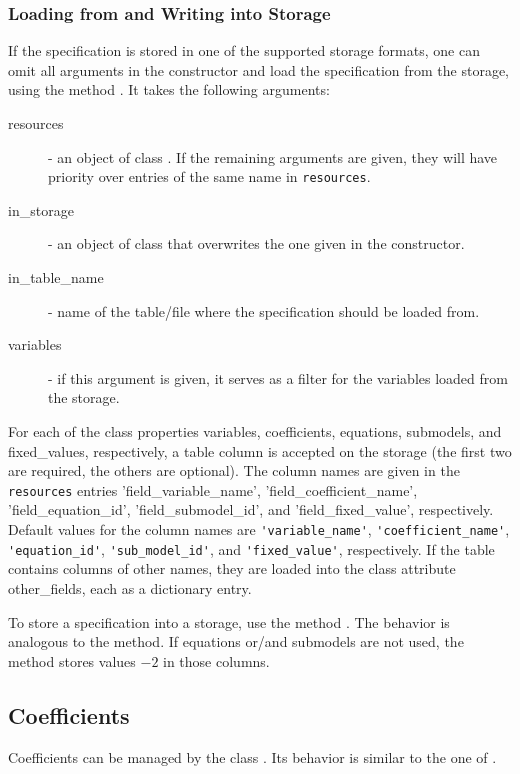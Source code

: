\subsubsection{Loading from and Writing into Storage}
%
If the specification is stored in one of the supported storage formats,
one can omit all arguments in the constructor and load the specification
from the storage, using the method . It takes the following
arguments:
\begin{description}
\item[resources] - an object of class . If the remaining
  arguments are given, they will have priority over entries of the same name
  in \verb|resources|.
\item[in_storage] -  an object of class  that overwrites the
  one given in the constructor.
\item[in_table_name] - name of the table/file where the specification should
  be loaded from.
\item[variables] - if this argument is given, it serves as a filter for the
  variables loaded from the storage.
\end{description}
For each of the class properties variables, coefficients, equations,
submodels, and fixed_values, respectively, a table column is accepted on the storage (the first two are required, 
the others are optional). The column
names are given in the \verb|resources| entries 'field_variable_name',
'field_coefficient_name', 'field_equation_id', 'field_submodel_id', and 'field_fixed_value', 
respectively. Default values for the column names are \verb|'variable_name'|, 
 \verb|'coefficient_name'|,
\verb|'equation_id'|, \verb|'sub_model_id'|, and \verb|'fixed_value'|, respectively. If the table contains 
columns of other names, they are loaded into the class attribute other_fields, each as a dictionary entry. 

To store a specification into a storage, use the method
. The behavior is
analogous to the  method. If equations or/and submodels are not
used, the method stores values $-2$ in those columns.


\subsection{Coefficients}

\label{sec:coefficients}
%
Coefficients can be managed by the class . Its behavior
is similar to the one of .

